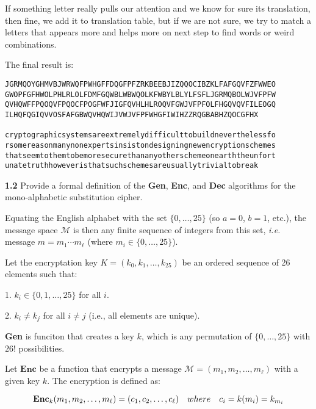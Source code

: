 If something letter really pulls our attention and we know for sure its translation, then fine, we add it to translation table, but if we are not sure, we try to match a letters that appears more and helps more on next step to find words or weird combinations.

The final result is:

\noindent
\begin{Verbatim}[frame=single]
JGRMQOYGHMVBJWRWQFPWHGFFDQGFPFZRKBEEBJIZQQOCIBZKLFAFGQVFZFWWEO
GWOPFGFHWOLPHLRLOLFDMFGQWBLWBWQOLKFWBYLBLYLFSFLJGRMQBOLWJVFPFW
QVHQWFFPQOQVFPQOCFPOGFWFJIGFQVHLHLROQVFGWJVFPFOLFHGQVQVFILEOGQ
ILHQFQGIQVVOSFAFGBWQVHQWIJVWJVFPFWHGFIWIHZZRQGBABHZQOCGFHX

cryptographicsystemsareextremelydifficulttobuildneverthelessfo
rsomereasonmanynonexpertsinsistondesigningnewencryptionschemes
thatseemtothemtobemoresecurethananyotherschemeonearththeunfort
unatetruthhoweveristhatsuchschemesareusuallytrivialtobreak
\end{Verbatim}

\vspace{1em}
\noindent
\textbf{1.2} \hspace{1em} Provide a formal definition of the \textbf{Gen}, \textbf{Enc}, and \textbf{Dec} algorithms for the mono-alphabetic substitution cipher.
\vspace{1em}

Equating the English alphabet with the set \(\{0, \dots, 25\}\) (so \( a = 0 \), \( b = 1 \), etc.), the message space 
\( \mathcal{M} \) is then any finite sequence of integers from this set, \textit{i.e.} message \( m = m_1 \cdots m_\ell \) (where \( m_i \in \{0, \dots, 25\} \)).

Let the encryptation key \( K = (k_0, k_1, \dots, k_{25}) \) be an ordered sequence of 26 elements such that:

1. \( k_i \in \{0, 1, \dots, 25\} \) for all \( i \).

2. \( k_i \neq k_j \) for all \( i \neq j \) (i.e., all elements are unique).  

\textbf{Gen} is funciton that creates a key \( k \), which is any permutation of \( \{0, \dots, 25\} \) with \( 26! \) possibilities.

Let \(\textbf{Enc}\) be a function that encrypts a message \( \mathcal{M} = (m_1, m_2, \dots, m_\ell) \) with a given key \( k \). The encryption is defined as:

\[
 \textbf{Enc\( _k\)}(m_1, m_2, \dots, m_\ell) = (c_1, c_2, \dots, c_\ell) \quad where \quad c_i = k(m_i) = k_{m_i}
\]

